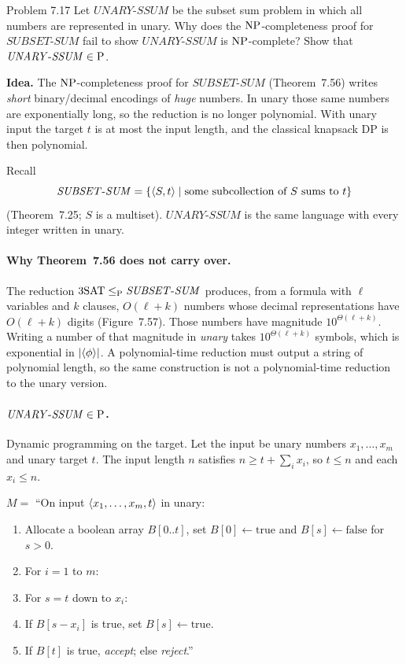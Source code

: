 \begin{question}{Problem 7.17}
Let $\mathit{UNARY\text{-}SSUM}$ be the subset sum problem in which all numbers are represented in unary. Why does the $\mathrm{NP}$-completeness proof for $\mathit{SUBSET\text{-}SUM}$ fail to show $\mathit{UNARY\text{-}SSUM}$ is $\mathrm{NP}$-complete? Show that $\mathit{UNARY\text{-}SSUM}\in\mathrm{P}$.
\end{question}
\begin{soln}
\textbf{Idea.} The $\mathrm{NP}$-completeness proof for $\mathit{SUBSET\text{-}SUM}$ (Theorem~7.56) writes \emph{short} binary/decimal encodings of \emph{huge} numbers. In unary those same numbers are exponentially long, so the reduction is no longer polynomial. With unary input the target $t$ is at most the input length, and the classical knapsack DP is then polynomial.

Recall
\[
\mathit{SUBSET\text{-}SUM}=\{\langle S,t\rangle\mid \text{some subcollection of $S$ sums to $t$}\}
\]
(Theorem~7.25; $S$ is a multiset). $\mathit{UNARY\text{-}SSUM}$ is the same language with every integer written in unary.

\paragraph{Why Theorem~7.56 does not carry over.}
The reduction $3\mathrm{SAT}\le_{\mathrm{P}}\mathit{SUBSET\text{-}SUM}$ produces, from a formula with $\ell$ variables and $k$ clauses, $O(\ell+k)$ numbers whose decimal representations have $O(\ell+k)$ digits (Figure~7.57). Those numbers have magnitude $10^{\Theta(\ell+k)}$. Writing a number of that magnitude in \emph{unary} takes $10^{\Theta(\ell+k)}$ symbols, which is exponential in $|\langle \phi\rangle|$. A polynomial-time reduction must output a string of polynomial length, so the same construction is not a polynomial-time reduction to the unary version.

\paragraph{$\mathit{UNARY\text{-}SSUM}\in\mathrm{P}$.}
Dynamic programming on the target. Let the input be unary numbers $x_1,\dots,x_m$ and unary target $t$. The input length $n$ satisfies $n\ge t+\sum_i x_i$, so $t\le n$ and each $x_i\le n$.

$M=$ ``On input $\langle x_1,\dots,x_m,t\rangle$ in unary:
\begin{enumerate}
\item Allocate a boolean array $B[0..t]$, set $B[0]\leftarrow\mathrm{true}$ and $B[s]\leftarrow\mathrm{false}$ for $s>0$.
\item For $i=1$ to $m$:
\item \quad For $s=t$ down to $x_i$:
\item \qquad If $B[s-x_i]$ is true, set $B[s]\leftarrow\mathrm{true}$.
\item If $B[t]$ is true, \emph{accept}; else \emph{reject}.''
\end{enumerate}


\end{soln}
